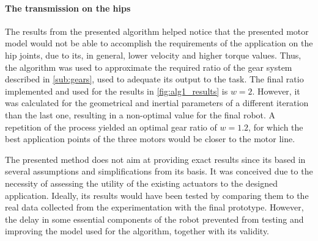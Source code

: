 \paragraph{The transmission on the hips} %
\label{par:the_hip_joint_gears}
The results from the presented algorithm helped notice that the presented motor model would not be able to accomplish the requirements of the application on the hip joints, due to its, in general, lower velocity and higher torque values.
Thus, the algorithm was used to approximate the required ratio of the gear system described in \ref{sub:gears}, used to adequate its output to the task.
The final ratio implemented and used for the results in \ref{fig:alg1_results} is $w=2$. 
However, it was calculated for the geometrical and inertial parameters of a different iteration than the last one, resulting in a non-optimal value for the final robot.
A repetition of the process yielded an optimal gear ratio of $w=1.2$, for which the best application points of the three motors would be closer to the motor line.


The presented method does not aim at providing exact results since its based in several assumptions and simplifications from its basis.
It was conceived due to the necessity of assessing the utility of the existing actuators to the designed application.
Ideally, its results would have been tested by comparing them to the real data collected from the experimentation with the final prototype. 
However, the delay in some essential components of the robot prevented from testing and improving the model used for the algorithm, together with its validity.





